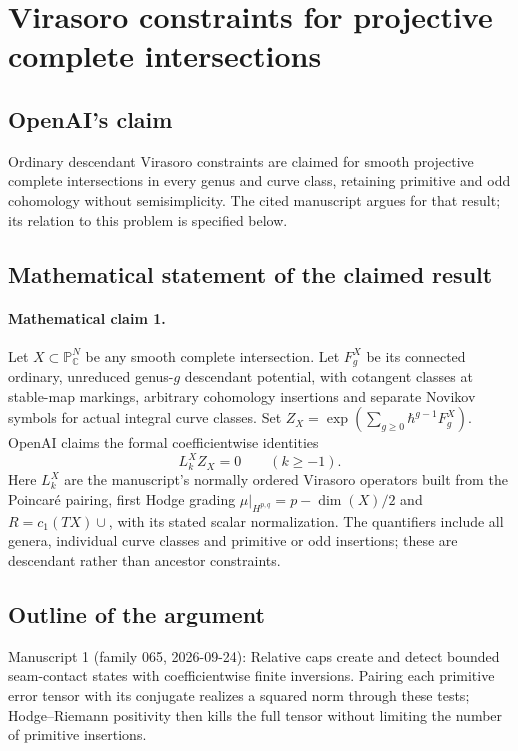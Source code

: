 \documentclass[11pt]{article}
\begin{document}
\section*{Virasoro constraints for projective complete intersections}

\subsection{OpenAI's claim}
Ordinary descendant Virasoro constraints are claimed for smooth projective complete intersections in every genus and curve class, retaining primitive and odd cohomology without semisimplicity. The cited manuscript argues for that result; its relation to this problem is specified below.

\subsection{Mathematical statement of the claimed result}
\paragraph{Mathematical claim 1.} Let $X\subset\mathbb P^N_{\mathbb C}$ be any smooth complete intersection. Let $F_g^X$ be its connected ordinary, unreduced genus-$g$ descendant potential, with cotangent classes at stable-map markings, arbitrary cohomology insertions and separate Novikov symbols for actual integral curve classes. Set $Z_X=\exp(\sum_{g\ge0}\hbar^{g-1}F_g^X)$. OpenAI claims the formal coefficientwise identities
\[
L_k^X Z_X=0\qquad(k\ge-1).
\]
Here $L_k^X$ are the manuscript's normally ordered Virasoro operators built from the Poincaré pairing, first Hodge grading $\mu|_{H^{p,q}}=p-\dim(X)/2$ and $R=c_1(TX)\cup$, with its stated scalar normalization. The quantifiers include all genera, individual curve classes and primitive or odd insertions; these are descendant rather than ancestor constraints.

\subsection{Outline of the argument}
Manuscript 1 (family 065, 2026-09-24): Relative caps create and detect bounded seam-contact states with coefficientwise finite inversions. Pairing each primitive error tensor with its conjugate realizes a squared norm through these tests; Hodge--Riemann positivity then kills the full tensor without limiting the number of primitive insertions.
\end{document}
